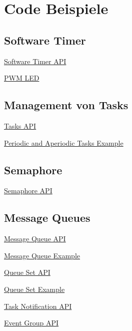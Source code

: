 \newpage
\onecolumn

\section{Code Beispiele}

\subsection{Software Timer}

\underline{Software Timer API}


\underline{PWM LED}



\subsection{Management von Tasks} \label{sec:task_management}

\underline{Tasks API}


\underline{Periodic and Aperiodic Tasks Example}


\subsection{Semaphore} \label{sec:semaphore_api}

\underline{Semaphore API}


\subsection{Message Queues} \label{sec:message_queue}

\underline{Message Queue API}


\underline{Message Queue Example}


\underline{Queue Set API}


\underline{Queue Set Example}


\underline{Task Notification API}


\underline{Event Group API}
